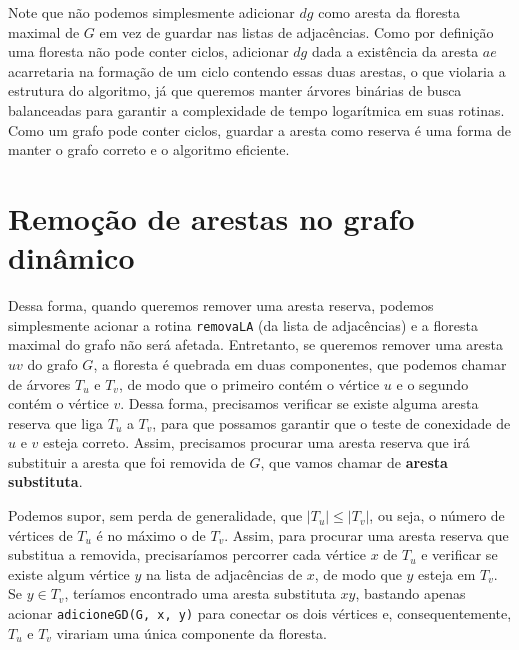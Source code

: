 Note que não podemos simplesmente adicionar $dg$ como aresta da floresta maximal de $G$ em vez de guardar nas listas de adjacências. Como por definição uma floresta não pode conter ciclos, adicionar $dg$ dada a existência da aresta $ae$ acarretaria na formação de um ciclo contendo essas duas arestas, o que violaria a estrutura do algoritmo, já que queremos manter árvores binárias de busca balanceadas para garantir a complexidade de tempo logarítmica em suas rotinas. Como um grafo pode conter ciclos, guardar a aresta como reserva é uma forma de manter o grafo correto e o algoritmo eficiente. 

\section{Remoção de arestas no grafo dinâmico}

Dessa forma, quando queremos remover uma aresta reserva, podemos simplesmente acionar a rotina \texttt{removaLA} (da lista de adjacências) e a floresta maximal do grafo não será afetada. Entretanto, se queremos remover uma aresta $uv$ do grafo $G$, a floresta é quebrada em duas componentes, que podemos chamar de árvores $T_u$ e $T_v$, de modo que o primeiro contém o vértice $u$ e o segundo contém o vértice $v$. Dessa forma, precisamos verificar se existe alguma aresta reserva que liga $T_u$ a $T_v$, para que possamos garantir que o teste de conexidade de $u$ e $v$ esteja correto. Assim, precisamos procurar uma aresta reserva que irá substituir a aresta que foi removida de $G$, que vamos chamar de \textbf{aresta substituta}.

Podemos supor, sem perda de generalidade, que $|T_u| \leq |T_v|$, ou seja, o número de vértices de $T_u$ é no máximo o de $T_v$. Assim, para procurar uma aresta reserva que substitua a removida, precisaríamos percorrer cada vértice $x$ de $T_u$ e verificar se existe algum vértice $y$ na lista de adjacências de $x$, de modo que $y$ esteja em $T_v$. Se $y \in T_v$, teríamos encontrado uma aresta substituta $xy$, bastando apenas acionar \texttt{adicioneGD(G, x, y)} para conectar os dois vértices e, consequentemente, $T_u$ e $T_v$ virariam uma única componente da floresta.


